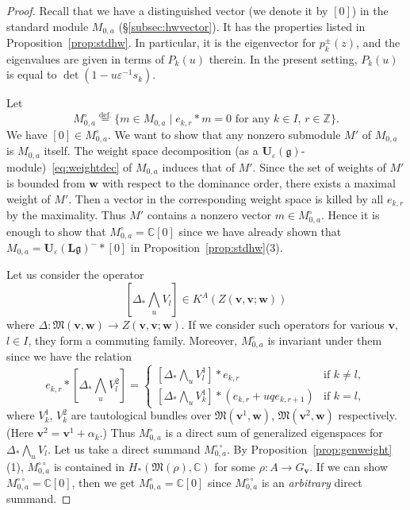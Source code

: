 \documentclass[12pt]{amsart}
\def\Bbb{\mathbb}
\def\frak{\mathfrak}
\theoremstyle{definition}
\theoremstyle{remark}
\numberwithin{equation}{subsection}
\newcommand{\propref}[1]{Proposition~\ref{#1}}
\newcommand{\subsecref}[1]{\S\ref{#1}}
\newcommand{\defeq}{\overset{\operatorname{\scriptstyle def.}}{=}}
\newcommand{\C}{{\Bbb C}}
\newcommand{\Z}{{\Bbb Z}}
\newcommand{\M}{{\frak M}} %
\newcommand{\bv}{{\mathbf v}} %
\newcommand{\bw}{{\mathbf w}} %
\newcommand{\Ue}{{\mathbf U}_{\varepsilon}(\mathfrak g)}
\newcommand{\Ule}{{\mathbf U}_{\varepsilon}({\mathbf L}\mathfrak g)}
\newcommand{\Wedge}{{\textstyle \bigwedge}}
\begin{document}
\begin{proof}
Recall that we have a distinguished vector (we denote it by $[0]$) in
the standard module $M_{0,a}$ (\subsecref{subsec:hwvector}).
It has the properties listed in \propref{prop:stdhw}.
In particular, it is the eigenvector for $p_k^\pm(z)$, and the
eigenvalues are given in terms of $P_k(u)$ therein. In the present
setting, $P_k(u)$ is equal to $\det( 1 - u\varepsilon^{-1}s_k)$.

Let
\begin{equation*}
   M_{0,a}^\circ \defeq \{ m\in M_{0,a} \mid
    \text{$e_{k,r}\ast m = 0$ for any $k\in I$, $r\in\Z$} \}.
\end{equation*}
We have $[0]\in M_{0,a}^\circ$.
%
We want to show that any nonzero submodule $M'$ of $M_{0,a}$ is
$M_{0,a}$ itself.
The weight space decomposition (as a
$\Ue$-module)~\eqref{eq:weightdec} of $M_{0,a}$ induces that of
$M'$.
%
Since the set of weights of $M'$ is bounded from $\bw$ with respect to
the dominance order, there exists a maximal weight of $M'$. Then a
vector in the corresponding weight space is killed by all
$e_{k,r}$ by the maximality. Thus
%
%
$M'$ contains a nonzero vector
$m\in M_{0,a}^\circ$. Hence it is enough to show that $M_{0,a}^\circ =
\C[0]$ since we have already shown that $M_{0,a} = \Ule^-\ast[0]$ in
\propref{prop:stdhw}(3).

Let us consider the operator
\begin{equation*}
   \left[ \Delta_* \Wedge_u V_l \right]
   \in K^A(Z(\bv,\bv;\bw))
\end{equation*}
where $\Delta\colon \M(\bv,\bw)\to Z(\bv,\bv;\bw)$. If we consider such
operators for various $\bv$, $l\in I$, they form a commuting family.
Moreover, $M_{0,a}^\circ$ is invariant under them since we have the
relation
\begin{equation*}
   e_{k,r} \ast \left[ \Delta_* \Wedge_u V^2_l \right]
   = 
   \begin{cases}
   \left[ \Delta_* \Wedge_u V^1_l \right] \ast e_{k,r}
      & \text{if $k\neq l$}, \\
   \left[ \Delta_* \Wedge_u V^1_k \right] \ast (e_{k,r}+uq e_{k,r+1})
      & \text{if $k = l$},
   \end{cases}
\end{equation*}
where $V^1_k$, $V^2_k$ are tautological bundles over
$\M(\bv^1,\bw)$, $\M(\bv^2,\bw)$ respectively.
(Here $\bv^2 = \bv^1 + \alpha_k$.)
%
Thus $M_{0,a}^\circ$ is a direct sum of generalized eigenspaces for
$\Delta_* \Wedge_u V_l$. Let us take a direct summand
$M_{0,a}^{\circ\circ}$. By \propref{prop:genweight}(1),
$M_{0,a}^{\circ\circ}$ is contained in $H_*(\M(\rho),\C)$ for some
$\rho\colon A\to G_\bv$. If we can show $M_{0,a}^{\circ\circ} =
\C[0]$, then we get $M_{0,a}^\circ = \C[0]$ since
$M_{0,a}^{\circ\circ}$ is an {\it arbitrary\/} direct summand.


\end{proof}
\end{document}
